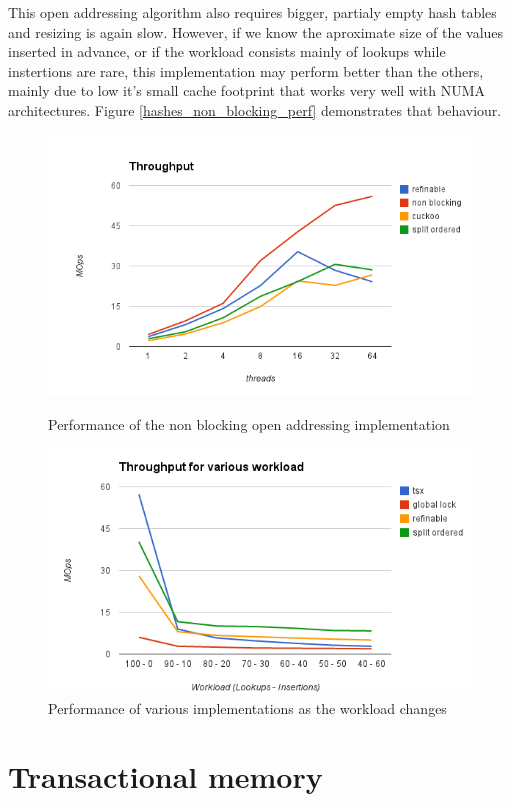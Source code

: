 This open addressing algorithm also requires bigger, partialy empty hash tables and resizing is again slow. However, if we know the aproximate size of the values inserted in advance, or if the workload consists mainly of lookups while instertions are rare, this implementation may perform better than the others,  mainly due to low it's small cache footprint that works very well with NUMA architectures. Figure \ref{hashes_non_blocking_perf} demonstrates that behaviour.

\begin{figure}
 \centering
  \includegraphics[scale=0.5]{hashes_non_blocking_perf.png}
\caption{Performance of the non blocking open addressing implementation}
\label{hashes_non_blocking_perf}
  \includegraphics[scale=0.5]{hashes_tsx_perf.png}
\caption{Performance of various implementations as the workload changes}
\label{hashes_tsx_perf}
\end{figure}

\section{Transactional memory}

